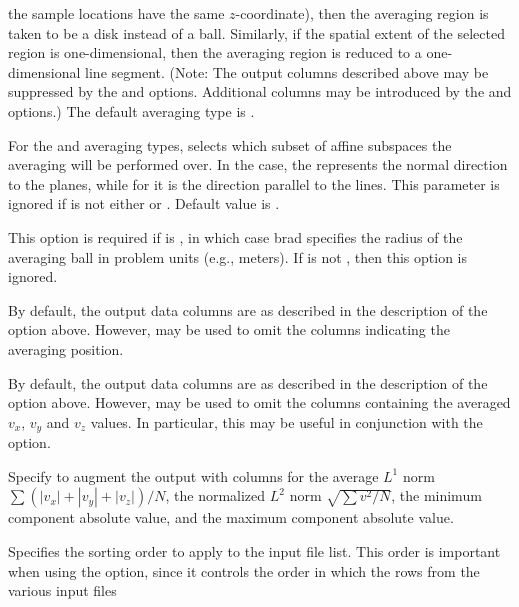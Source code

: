 \begin{description}
  the sample locations have the same $z$-coordinate), then the
  averaging region is taken to be a disk instead of a ball.
  Similarly, if the spatial extent of the selected region is
  one-dimensional, then the averaging region is reduced to a
  one-dimensional line segment.  (Note: The output columns described
  above may be suppressed by the  and
   options.  Additional columns may be introduced by
  the  and  options.)  The default averaging
  type is .
\item[\optkey{-axis \boa x\pipe y\pipe z\bca}]
  For the  and  averaging types,
  selects which subset of affine subspaces the averaging will be
  performed over.  In the  case, the  represents
  the normal direction to the planes, while for  it is the
  direction parallel to the lines.  This parameter is ignored if
   is not either  or .  Default value
  is .
\item[\optkey{-ball\_radius brad}]
  This option is required if  is , in which case
  brad specifies the radius of the averaging ball in problem
  units (e.g., meters).  If   is not , then this
  option is ignored.
\item[\optkey{-defaultpos \boa 0\pipe 1\bca}]
  By default, the output data columns are as described in the
  description of the  option above.  However,
   may be used to omit the columns indicating the
  averaging position.
\item[\optkey{-defaultvals \boa 0\pipe 1\bca}]
  By default, the output data columns are as described in the
  description of the  option above.  However,
   may be used to omit the columns containing the
  averaged $v_x$, $v_y$ and $v_z$ values.  In particular, this may be
  useful in conjunction with the  option.
\item[\optkey{-extravals \boa 0\pipe 1\bca}]
  Specify  to augment the output with columns
  for the average $L^1$ norm
  $\sum\left(|v_x| + |v_y| + |v_z|\right)/N$, the normalized $L^2$
  norm $\sqrt{\sum v^2/N}$, the minimum component absolute value,
  and the maximum component absolute value.
\item[\optkey{-filesort method}]
  Specifies the sorting order to apply to the input file list.  This
  order is important when using the  option, since it
  controls the order in which the rows from the various input files

\end{description}
